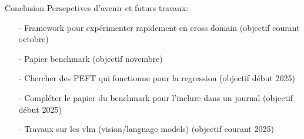 \begin{subsectionframemod}{Conclusion}
Persepctives d'avenir et futurs travaux:
\begin{itemize}
    \item[-]  Framework pour expérimenter rapidement en cross domain (objectif courant octobre)
    \item[-]  Papier benchmark (objectif novembre)
    \item[-]  Chercher des PEFT qui fonctionne pour la regression (objectif début 2025)
    \item[-]  Compléter le papier du benchmark pour l'inclure dans un journal (objectif début 2025)
    \item[-]  Travaux sur les vlm (vision/language models) (objectif courant 2025)
\end{itemize}


\end{subsectionframemod}